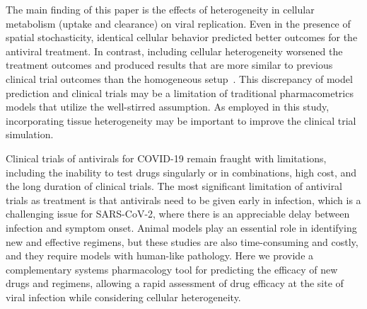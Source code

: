 
The main finding of this paper is the effects of heterogeneity in cellular metabolism (uptake and clearance) on viral replication. Even in the presence of spatial stochasticity, identical cellular behavior predicted better outcomes for the antiviral treatment. In contrast, including cellular heterogeneity worsened the treatment outcomes and produced results that are more similar to previous clinical trial outcomes than the homogeneous setup~\cite{wang2020remdesivir}. This discrepancy of model prediction and clinical trials may be a limitation of traditional pharmacometrics models that utilize the well-stirred assumption. As employed in this study, incorporating tissue heterogeneity may be important to improve the clinical trial simulation.

Clinical trials of antivirals for COVID-19 remain fraught with limitations, including the inability to test drugs singularly or in combinations, high cost, and the long duration of clinical trials. The most significant limitation of antiviral trials as treatment is that antivirals need to be given early in infection, which is a challenging issue for SARS-CoV-2, where there is an appreciable delay between infection and symptom onset. Animal models play an essential role in identifying new and effective regimens, but these studies are also time-consuming and costly, and they require models with human-like pathology. Here we provide a complementary systems pharmacology tool for predicting the efficacy of new drugs and regimens, allowing a rapid assessment of drug efficacy at the site of viral infection while considering cellular heterogeneity.
